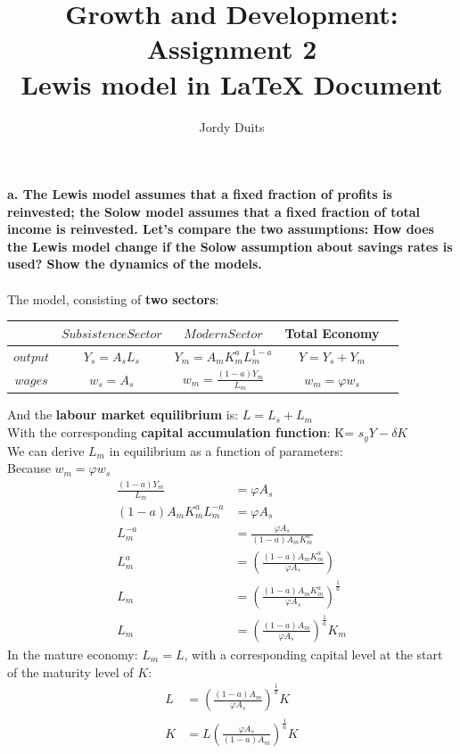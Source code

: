 \documentclass{article}
\begin{document}
\title{Growth and Development: Assignment 2 \\
 Lewis model in \LaTeX{} Document}
\author{Jordy Duits}
\maketitle



\textbf {
a. The Lewis model assumes that a fixed fraction of profits is reinvested;
the Solow model assumes that a fixed  fraction of total income is reinvested. 
Let’s compare the two assumptions: How does the Lewis model change if the
Solow assumption about savings rates is used? Show the dynamics of the models.}
\\
\\
The model, consisting of \textbf {two sectors}:
\begin{center}
\begin{tabular}{c|cccc}
 		& $Subsistence Sector$ 	& $Modern Sector$ 		&Total Economy					\\
\hline
$output$ 	& $Y_s=A_sL_s$ 	& $Y_m=A_mK^{a}_mL_m^{1-a}$   	& $Y=Y_s+Y_m$				\\
$wages$	& $w_s=A_s$	& $w_m= \frac{(1-a)Y_m}{L_m}$ 	& $w_m={\varphi}w_s$			\\
\end{tabular}
\end{center}
And the \textbf {labour market equilibrium} is: 				$L=L_s+L_m$				\\
With the corresponding \textbf {capital accumulation function}:		{\.K}= $s_yY-{\delta}K$			\\
We can derive  $L_m$ in equilibrium as a function of parameters: 	\\
Because $w_m={\varphi}w_s$ 
\begin{align}
\frac{(1-a)Y_m}{L_m} & = {\varphi}A_s 		\\
(1-a)A_mK_m^aL^{-a}_m & = {\varphi}A_s 	\\
L^{-a}_m & = \frac{{\varphi}A_s}{(1-a)A_mK^a_m} \\
L^{a}_m & = (\frac{(1-a)A_mK^a_m}{{\varphi}A_s})\\
L_m & = (\frac{(1-a)A_mK^a_m}{{\varphi}A_s})^{\frac{1}{a}}\\
L_m & = (\frac{(1-a)A_m}{{\varphi}A_s})^{\frac{1}{a}}K_m 
\end{align}
In the mature economy: $L_m=L$, with a corresponding capital level at the start of the maturity level of $K$: \\
\begin{align}
L & = (\frac{(1-a)A_m}{{\varphi}A_s})^{\frac{1}{a}}K 	\\
K & = L(\frac{{\varphi}A_s}{(1-a)A_m})^{\frac{1}{a}}K 
\end{align}
\end{document}
